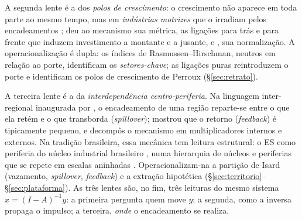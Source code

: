 \documentclass[11pt,a4paper]{article}
\begin{document}
A segunda lente é a dos \emph{polos de crescimento}: o crescimento não aparece em toda
parte ao mesmo tempo, mas em \emph{indústrias motrizes} que o irradiam pelos encadeamentos
\citep{perroux1955}; \citet{hirschman1958} deu ao mecanismo sua métrica, as ligações para trás
e para frente que induzem investimento a montante e a jusante, e \citet{rasmussen1956}, sua
normalização. A operacionalização é dupla: os índices de Rasmussen--Hirschman, neutros em
relação ao porte, identificam os \emph{setores-chave}; as ligações puras
\citep{cella1984,guilhoto2005linkages} reintroduzem o porte e identificam os polos de
crescimento de Perroux (\S\ref{sec:retrato}).

A terceira lente é a da \emph{interdependência centro-periferia}. Na linguagem
inter-regional inaugurada por \citet{isard1951}, o encadeamento de uma região reparte-se entre
o que ela retém e o que transborda (\emph{spillover}); \citet{miller1966} mostrou que o retorno
(\emph{feedback}) é tipicamente pequeno, e \citet{miyazawa1966} decompôs o mecanismo em
multiplicadores internos e externos. Na tradição brasileira, essa mecânica tem leitura
estrutural: o ES como periferia do núcleo industrial brasileiro \citep{cano1985}, numa
hierarquia de núcleos e periferias que se repete em escalas aninhadas \citep{friedmann1966}.
Operacionalizam-na a partição de Isard (vazamento, \emph{spillover}, \emph{feedback}) e a
extração hipotética \citep{dietzenbacher1993} (\S\ref{sec:territorio}--\S\ref{sec:plataforma}).
As três lentes são, no fim, três leituras do mesmo sistema $x=(I-A)^{-1}y$: a primeira pergunta
quem move $y$; a segunda, como a inversa propaga o impulso; a terceira, \emph{onde} o
encadeamento se realiza.
\end{document}

